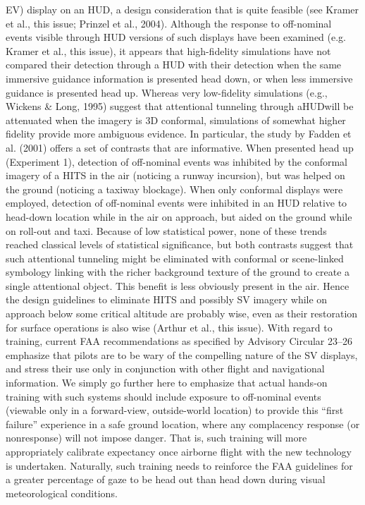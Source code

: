 \documentclass[utf8,bachelor,manualbib]{gradu3}
\begin{document}
EV) display on an HUD, a design consideration that is quite feasible (see Kramer
et al., this issue; Prinzel et al., 2004). Although the response to off-nominal events
visible through HUD versions of such displays have been examined (e.g. Kramer
et al., this issue), it appears that high-fidelity simulations have not compared their
detection through a HUD with their detection when the same immersive guidance
information is presented head down, or when less immersive guidance is presented
head up. Whereas very low-fidelity simulations (e.g., Wickens \& Long, 1995) suggest
that attentional tunneling through aHUDwill be attenuated when the imagery is
3D conformal, simulations of somewhat higher fidelity provide more ambiguous evidence.
In particular, the study by Fadden et al. (2001) offers a set of contrasts that
are informative. When presented head up (Experiment 1), detection of off-nominal
events was inhibited by the conformal imagery of a HITS in the air (noticing a runway
incursion), but was helped on the ground (noticing a taxiway blockage). When
only conformal displays were employed, detection of off-nominal events were inhibited
in an HUD relative to head-down location while in the air on approach, but
aided on the ground while on roll-out and taxi. Because of low statistical power,
none of these trends reached classical levels of statistical significance, but both contrasts
suggest that such attentional tunneling might be eliminated with conformal or
scene-linked symbology linking with the richer background texture of the ground to
create a single attentional object. This benefit is less obviously present in the air.
Hence the design guidelines to eliminate HITS and possibly SV imagery while on
approach below some critical altitude are probably wise, even as their restoration for
surface operations is also wise (Arthur et al., this issue).
With regard to training, current FAA recommendations as specified by Advisory
Circular 23–26 emphasize that pilots are to be wary of the compelling nature
of the SV displays, and stress their use only in conjunction with other flight and
navigational information. We simply go further here to emphasize that actual
hands-on training with such systems should include exposure to off-nominal
events (viewable only in a forward-view, outside-world location) to provide this
“first failure” experience in a safe ground location, where any complacency response
(or nonresponse) will not impose danger. That is, such training will more
appropriately calibrate expectancy once airborne flight with the new technology is
undertaken. Naturally, such training needs to reinforce the FAA guidelines for a
greater percentage of gaze to be head out than head down during visual meteorological
conditions. \citep{wickens2009}
\end{document}
